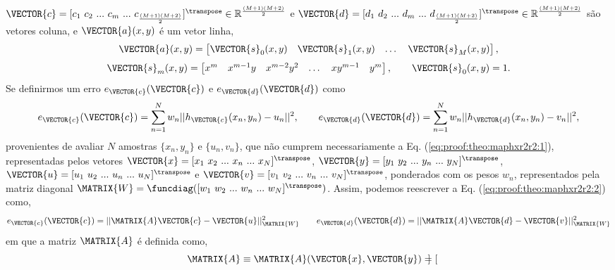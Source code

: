 \begin{myproofT}
$\VECTOR{c}=[c_1~ c_2~ ...~ c_m~ ...~ c_{\frac{(M+1)(M+2)}{2}}]^{\transpose} \in \mathbb{R}^{\frac{(M+1)(M+2)}{2}}$ e
$\VECTOR{d}=[d_1~ d_2~ ...~ d_m~ ...~ d_{\frac{(M+1)(M+2)}{2}}]^{\transpose} \in \mathbb{R}^{\frac{(M+1)(M+2)}{2}}$ 
são vetores coluna, e
$\VECTOR{a}(x,y)$ é um vetor linha,
\begin{equation}
\VECTOR{a}(x,y)= 
\begin{bmatrix}
\VECTOR{s}_{0}(x,y) & \VECTOR{s}_{1}(x,y) &  \dots  & \VECTOR{s}_{M}(x,y)
\end{bmatrix},
\end{equation}
\begin{equation}
\VECTOR{s}_{m}(x,y)=
\begin{bmatrix}
x^m  & x^{m-1} y  & x^{m-2} y^2    & \dots  & x y^{m-1} &  y^m 
\end{bmatrix},
\qquad
\VECTOR{s}_{0}(x,y)=1.
\end{equation}
Se definirmos um erro $e_{\VECTOR{c}}(\VECTOR{c})$ e $e_{\VECTOR{d}}(\VECTOR{d})$ como
\begin{equation}\label{eq:proof:theo:maphxr2r2:2}
e_{\VECTOR{c}}(\VECTOR{c}) 
=  
\sum_{n=1}^{N} w_n||h_{\VECTOR{c}}(x_n,y_n)-u_n||^2,
\qquad
e_{\VECTOR{d}}(\VECTOR{d}) 
=  
\sum_{n=1}^{N} w_n||h_{\VECTOR{d}}(x_n,y_n)-v_n||^2,
\end{equation}
provenientes de avaliar $N$ amostras $\{x_n,y_n\}$ e $\{u_n,v_n\}$, 
que não cumprem necessariamente a Eq. (\ref{eq:proof:theo:maphxr2r2:1}), 
representadas pelos vetores 
$\VECTOR{x}=[x_1~ x_2~ ...~ x_n~ ...~ x_N]^{\transpose}$,
$\VECTOR{y}=[y_1~ y_2~ ...~ y_n~ ...~ y_N]^{\transpose}$, 
$\VECTOR{u}=[u_1~ u_2~ ...~ u_n~ ...~ u_N]^{\transpose}$ e
$\VECTOR{v}=[v_1~ v_2~ ...~ v_n~ ...~ v_N]^{\transpose}$,
ponderados com os pesos $w_n$, representados pela matriz diagonal 
$\MATRIX{W}=\funcdiag([w_1~ w_2~ ...~ w_n~ ...~ w_N]^{\transpose})$.
Assim, podemos reescrever a Eq. (\ref{eq:proof:theo:maphxr2r2:2}) como,
\begin{equation}\label{eq:proof:theo:maphxr2r2:3}
e_{\VECTOR{c}}(\VECTOR{c}) = ||\MATRIX{A}\VECTOR{c}-\VECTOR{u}||_{\MATRIX{W}}^2 
\qquad
e_{\VECTOR{d}}(\VECTOR{d}) = ||\MATRIX{A}\VECTOR{d}-\VECTOR{v}||_{\MATRIX{W}}^2 
\end{equation}
em que a matriz $\MATRIX{A}$ é definida como,
\begin{equation}\label{eq:proof:maphxr2r2:4}
\MATRIX{A}\equiv \MATRIX{A}(\VECTOR{x},\VECTOR{y})=\begin{bmatrix}

\end{bmatrix}
\end{equation}
\end{myproofT}
